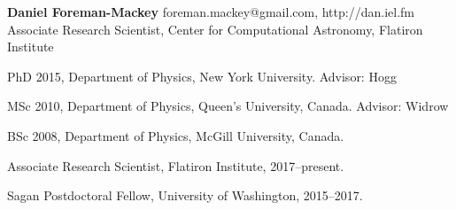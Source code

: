 \documentclass[12pt,letterpaper]{article}
\begin{document}
\thispagestyle{empty}\sloppy\sloppypar\raggedbottom

\textbf{\Large Daniel Foreman-Mackey} \hfill
\textsf{\small foreman.mackey@gmail.com, http://dan.iel.fm} \\[0.5ex]
Associate Research Scientist, Center for Computational Astronomy, Flatiron Institute\\[0.5ex]

\begin{list}{}{\cvlist}
\item
PhD 2015, Department of Physics, New York University. Advisor: Hogg
\item
MSc 2010, Department of Physics, Queen's University, Canada. Advisor: Widrow
\item
BSc 2008, Department of Physics, McGill University, Canada.
\end{list}

\begin{list}{}{\cvlist}
\item
Associate Research Scientist, Flatiron Institute, 2017--present.
\item
Sagan Postdoctoral Fellow, University of Washington, 2015--2017.
\end{list}

\ifdefined\withpubs

    \begin{list}{}{\cvlist}
    
    \end{list}

    \begin{list}{}{\cvlist}
    
    \end{list}
\fi
\end{document}

